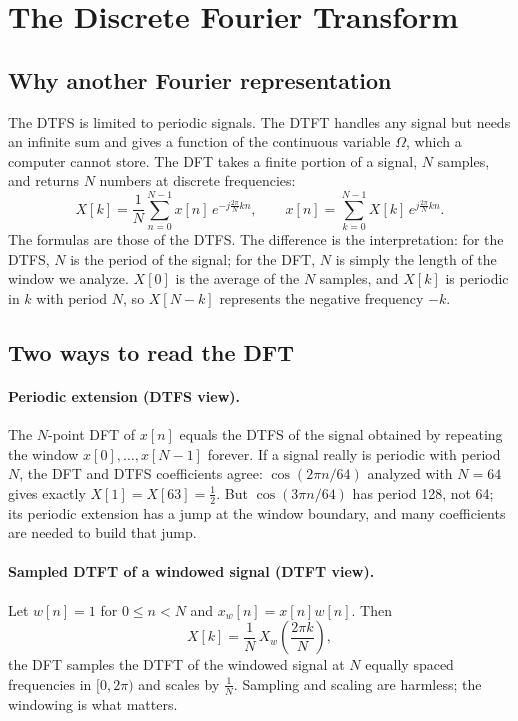 \documentclass[11pt]{article}
\numberwithin{equation}{section}
\theoremstyle{definition}
\theoremstyle{remark}
\begin{document}
\section{The Discrete Fourier Transform}

\subsection{Why another Fourier representation}
The DTFS is limited to periodic signals. The DTFT handles any signal but needs an infinite sum and
gives a function of the continuous variable $\Omega$, which a computer cannot store. The DFT takes
a finite portion of a signal, $N$ samples, and returns $N$ numbers at discrete frequencies:
\begin{equation}
X[k]=\frac1N\sum_{n=0}^{N-1}x[n]\,e^{-j\frac{2\pi}{N}kn},\qquad
x[n]=\sum_{k=0}^{N-1}X[k]\,e^{j\frac{2\pi}{N}kn}.
\end{equation}
The formulas are those of the DTFS. The difference is the interpretation: for the DTFS, $N$ is the
period of the signal; for the DFT, $N$ is simply the length of the window we analyze.
$X[0]$ is the average of the $N$ samples, and $X[k]$ is periodic in $k$ with period $N$, so
$X[N-k]$ represents the negative frequency $-k$.

\subsection{Two ways to read the DFT}
\paragraph{Periodic extension (DTFS view).} The $N$-point DFT of $x[n]$ equals the DTFS of the
signal obtained by repeating the window $x[0],\dots,x[N-1]$ forever. If a signal really is
periodic with period $N$, the DFT and DTFS coefficients agree: $\cos(2\pi n/64)$ analyzed with $N=64$
gives exactly $X[1]=X[63]=\frac12$. But $\cos(3\pi n/64)$ has period 128, not 64; its periodic
extension has a jump at the window boundary, and many coefficients are needed to build that jump.

\paragraph{Sampled DTFT of a windowed signal (DTFT view).} Let $w[n]=1$ for $0\le n<N$ and
$x_w[n]=x[n]w[n]$. Then
\begin{equation}
\boxed{\;X[k]=\frac1N\,X_w\!\left(\frac{2\pi k}{N}\right),\;}
\end{equation}
the DFT samples the DTFT of the windowed signal at $N$ equally spaced frequencies in $[0,2\pi)$ and
scales by $\frac1N$. Sampling and scaling are harmless; the windowing is what matters.
\end{document}
